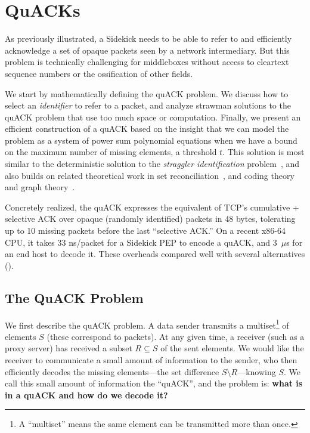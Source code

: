 \chapter{QuACKs}
\label{sec:quack}

As previously illustrated, a Sidekick needs to be able to refer to and efficiently
acknowledge a set of opaque packets seen by a network intermediary.
But this problem is technically challenging for middleboxes without access to
cleartext sequence numbers or the ossification of other fields.

We start by mathematically defining the quACK problem.
We discuss how to select an \emph{identifier} to refer to a packet,
and analyze strawman solutions to the quACK problem
that use too much space or computation.
Finally, we present an efficient construction of a quACK based on the insight
that we can model the problem as a system of power sum polynomial equations
when we have a bound on the maximum number of missing elements, a threshold $t$.
This solution is most similar to the deterministic solution to the
\emph{straggler identification} problem~\cite{eppstein2011straggler}, and also builds on
related theoretical work in set reconciliation~\cite{minsky2003set}, and coding
theory and graph theory~\cite{karpovsky2003data}.

Concretely realized, the quACK expresses the equivalent of TCP's
cumulative + selective ACK over opaque (randomly identified) packets
in 48 bytes, tolerating up to 10 missing packets before the last
``selective ACK.'' On a recent x86-64 CPU, it takes 33 ns/packet for a Sidekick PEP
to encode a quACK, and 3~$\mu$s for an end host to decode it. These
overheads compared well with several alternatives ().

\section{The QuACK Problem}
\label{sec:quack:problem}

We first describe the quACK problem. A data sender transmits a multiset\footnote
{A ``multiset'' means the same element can be transmitted more than once.} of
elements $S$ (these correspond to packets). At any given time, a receiver
(such as a proxy server) has received a subset $R \subseteq S$ of the sent
elements. We would like the receiver to communicate a small amount of
information to the sender, who then efficiently decodes the missing
elements---the set difference $S \setminus R$---knowing $S$. We call this small
amount of information the ``quACK'', and the problem is:
\textbf{what is in a quACK and how do we decode it?}

